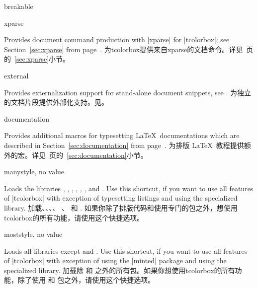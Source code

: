 \begin{docTcbKey}[library]{breakable}{}{}
\begin{docTcbKey}[library]{xparse}{}{}
\begin{stripedbox}
Provides document command production with |xparse| for |tcolorbox|;
see Section~\ref{sec:xparse} from page~\pageref{sec:xparse}.
\tcblower
为tcolorbox提供来自xparse的文档命令。详见~\pageref{sec:xparse}页的~\ref{sec:xparse}小节。
\end{stripedbox}
\end{docTcbKey}

\begin{docTcbKey}[library]{external}{}{}
\begin{stripedbox}
Provides externalization support for stand-alone document snippets,
see .
\tcblower
为独立的文档片段提供外部化支持。见。
\end{stripedbox}
\end{docTcbKey}

\begin{docTcbKey}[library]{documentation}{}{}
\begin{stripedbox}
Provides additional macros for typesetting \LaTeX\ documentations
which are described in Section~\ref{sec:documentation}
from page~\pageref{sec:documentation}. 
\tcblower
为排版 \LaTeX\ 教程提供额外的宏。详见~\pageref{sec:documentation}页的~\ref{sec:documentation}小节。
\end{stripedbox}
\end{docTcbKey}

\begin{docTcbKey}[library]{many}{}{style, no value}
\begin{stripedbox}
Loads the libraries , , , ,
, , and .
Use this shortcut, if you want to use all features of |tcolorbox|
with exception of typesetting listings and using
the specialized  library.
\tcblower
加载、、、、%
、 和 .%
如果你除了排版代码和使用专门的包之外，想使用tcolorbox的所有功能，请使用这个快捷选项。
\end{stripedbox}
\end{docTcbKey}

\begin{docTcbKey}[library]{most}{}{style, no value}
\begin{stripedbox}
Loads all libraries except  and .
Use this shortcut, if you want to use all features of |tcolorbox|
with exception of using the |minted| package and using
the specialized  library.
\tcblower
加载除  和  之外的所有包。如果你想使用tcolorbox的所有功能，除了使用  和  包之外，请使用这个快捷选项。
\end{stripedbox}
\end{docTcbKey}


\end{docTcbKey}
